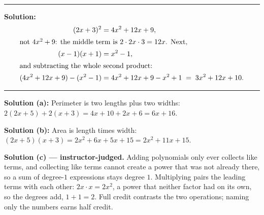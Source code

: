 \documentclass[12pt]{article}
\begin{document}
\vspace{0.15cm}\noindent\rule{\linewidth}{0.2pt}


\textbf{Solution:}
\begin{align*}
  (2x+3)^2 &= 4x^2 + 12x + 9,\\
  \intertext{not $4x^2 + 9$: the middle term is $2\cdot 2x\cdot 3 = 12x$. Next,}
  (x-1)(x+1) &= x^2 - 1,\\
  \intertext{and subtracting the whole second product:}
  (4x^2 + 12x + 9) - (x^2 - 1) &= 4x^2 + 12x + 9 - x^2 + 1 \;=\; 3x^2 + 12x + 10.
\end{align*}

\vspace{0.15cm}\noindent\rule{\linewidth}{0.2pt}


\textbf{Solution (a):} \quad Perimeter is two lengths plus two widths:
$2(2x+5) + 2(x+3) = 4x + 10 + 2x + 6 = 6x + 16$. 

\noindent\textbf{Solution (b):} \quad Area is length times width:
$(2x+5)(x+3) = 2x^2 + 6x + 5x + 15 = 2x^2 + 11x + 15$. 

\noindent\textbf{Solution (c) --- instructor-judged.} Adding polynomials only ever collects like
terms, and collecting like terms cannot create a power that was not already there, so a sum of
degree-$1$ expressions stays degree $1$. Multiplying pairs the leading terms with each other:
$2x \cdot x = 2x^2$, a power that neither factor had on its own, so the degrees add,
$1 + 1 = 2$. Full credit contrasts the two operations; naming only the numbers earns half credit.
\end{document}

